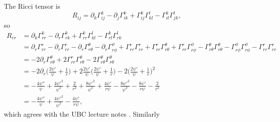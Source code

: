 \documentclass[12pt]{article}
\numberwithin{equation}{section}
\begin{document}
The Ricci tensor is
\begin{equation}
R_{ij} = \partial_k \Gamma^k_{ij} - \partial_j \Gamma^k_{ik} + \Gamma^k_{ij} \Gamma^l_{kl} - \Gamma^k_{il} \Gamma^l_{jk},
\end{equation}
so
\begin{equation}
\begin{aligned}
R_{rr} &= \partial_k \Gamma^k_{rr} - \partial_r \Gamma^k_{rk} + \Gamma^k_{rr} \Gamma^l_{kl} - \Gamma^k_{rl} \Gamma^l_{rk} \\
&= \partial_r \Gamma^r_{rr} - \partial_r \Gamma^r_{r r} - \partial_r \Gamma^\theta_{r\theta} - \partial_r \Gamma^\phi_{r\phi} + \Gamma^r_{rr} \Gamma^r_{rr} + \Gamma^r_{rr} \Gamma^\theta_{r\theta} + \Gamma^r_{rr} \Gamma^\phi_{r \phi} - \Gamma^\theta_{r\theta} \Gamma^\theta_{r\theta} - \Gamma^\phi_{r \phi} \Gamma^\phi_{r\phi} - \Gamma^r_{rr} \Gamma^r_{rr} \\
&= - 2 \partial_r \Gamma^\theta_{r\theta} + 2 \Gamma^r_{rr} \Gamma^\theta_{r\theta} - 2 \Gamma^\theta_{r\theta} \Gamma^\theta_{r\theta} \\
&= - 2 \partial_r \Big( \frac{2 \psi'}{\psi}  + \frac{1}{r} \Big) + 2 \frac{2 \psi'}{\psi} \Big( \frac{2 \psi'}{\psi}  + \frac{1}{r} \Big) - 2 \Big( \frac{2 \psi'}{\psi}  + \frac{1}{r} \Big)^2 \\
&= - \frac{4 \psi''}{\psi} + \frac{4 \psi'^2}{\psi^2} + \frac{2}{r^2} + \frac{8 \psi'^2}{\psi^2}  + \frac{4 \psi'}{r \psi} - \frac{8 \psi'^2}{\psi^2} - \frac{8 \psi'}{r \psi} - \frac{2}{r^2} \\
&= - \frac{4 \psi''}{\psi} + \frac{4 \psi'^2}{\psi^2} - \frac{4 \psi'}{r \psi},
\end{aligned}
\end{equation}
which agrees with the UBC lecture notes \cite{Inaki}.  Similarly
\end{document}

